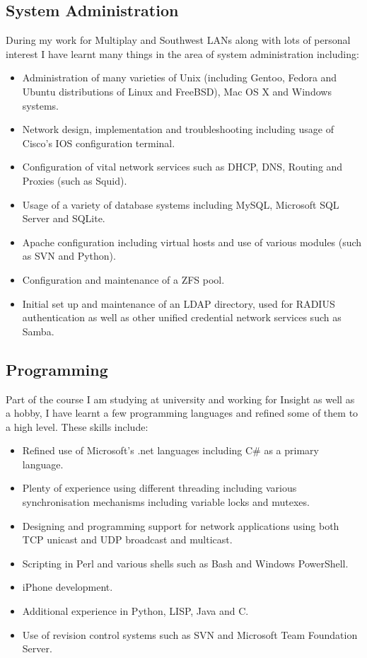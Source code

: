 \documentclass[11pt]{report}
\begin{document}
\subsection*{System Administration}
During my work for Multiplay and Southwest LANs along with lots of personal interest I have learnt many things in the area of system administration including:
\begin{itemize}[itemsep=2pt ,parsep=2pt]
\item Administration of many varieties of Unix (including Gentoo, Fedora and Ubuntu distributions of Linux and FreeBSD), Mac OS X and Windows systems.
\item Network design, implementation and troubleshooting including usage of Cisco's IOS configuration terminal.
\item Configuration of vital network services such as DHCP, DNS, Routing and Proxies (such as Squid).
\item Usage of a variety of database systems including MySQL, Microsoft SQL Server and SQLite.
\item Apache configuration including virtual hosts and use of various modules (such as SVN and Python).
\item Configuration and maintenance of a ZFS pool.
\item Initial set up and maintenance of an LDAP directory, used for RADIUS authentication as well as other unified credential network services such as Samba.
\end{itemize}
\subsection*{Programming}
Part of the course I am studying at university and working for Insight as well as a hobby, I have learnt a few programming languages and refined some of them to a high level. These skills include:
\begin{itemize}[itemsep=2pt ,parsep=2pt]
\item Refined use of Microsoft's .net languages including C\# as a primary language.
\item Plenty of experience using different threading including various synchronisation mechanisms including variable locks and mutexes.
\item Designing and programming support for network applications using both TCP unicast and UDP broadcast and multicast.
\item Scripting in Perl and various shells such as Bash and Windows PowerShell.
\item iPhone development.
\item Additional experience in Python, LISP, Java and C.
\item Use of revision control systems such as SVN and Microsoft Team Foundation Server.
\end{itemize}
\end{document}
